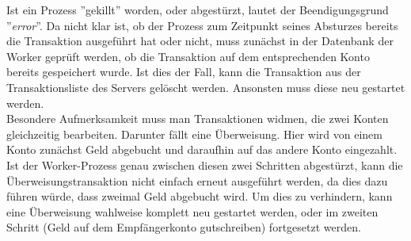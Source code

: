 Ist ein Prozess ''gekillt'' worden, oder abgestürzt, lautet der Beendigungsgrund ''\textit{error}''. Da nicht klar ist, ob der Prozess zum Zeitpunkt seines Absturzes bereits die Transaktion ausgeführt hat oder nicht, muss zunächst in der Datenbank der Worker geprüft werden, ob die Transaktion auf dem entsprechenden Konto bereits gespeichert wurde. Ist dies der Fall, kann die Transaktion aus der Transaktionsliste des Servers gelöscht werden. Ansonsten muss diese neu gestartet werden.\\
Besondere Aufmerksamkeit muss man Transaktionen widmen, die zwei Konten gleichzeitig bearbeiten. Darunter fällt eine Überweisung. Hier wird von einem Konto zunächst Geld abgebucht und daraufhin auf das andere Konto eingezahlt. Ist der Worker-Prozess genau zwischen diesen zwei Schritten abgestürzt, kann die Überweisungstransaktion nicht einfach erneut ausgeführt werden, da dies dazu führen würde, dass zweimal Geld abgebucht wird. Um dies zu verhindern, kann eine Überweisung wahlweise komplett neu gestartet werden, oder im zweiten Schritt (Geld auf dem Empfängerkonto gutschreiben) fortgesetzt werden.